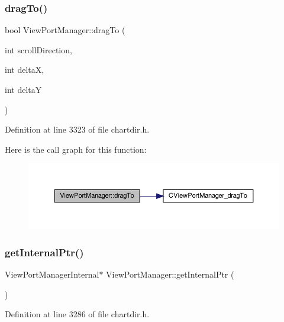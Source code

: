 \subsubsection{\texorpdfstring{drag\+To()}{dragTo()}}
{\footnotesize\ttfamily bool View\+Port\+Manager\+::drag\+To (\begin{DoxyParamCaption}\item[{int}]{scroll\+Direction,  }\item[{int}]{deltaX,  }\item[{int}]{deltaY }\end{DoxyParamCaption})\hspace{0.3cm}{\ttfamily [inline]}}



Definition at line 3323 of file chartdir.\+h.

Here is the call graph for this function\+:
\nopagebreak
\begin{figure}[H]
\begin{center}
\leavevmode
\includegraphics[width=350pt]{class_view_port_manager_aeea4d7130197f70eb7ab453316e79c77_cgraph}
\end{center}
\end{figure}
\mbox{\label{class_view_port_manager_af3aa3a669ee164439737ea284c6c9cdf}} 
\subsubsection{\texorpdfstring{get\+Internal\+Ptr()}{getInternalPtr()}}
{\footnotesize\ttfamily View\+Port\+Manager\+Internal$\ast$ View\+Port\+Manager\+::get\+Internal\+Ptr (\begin{DoxyParamCaption}{ }\end{DoxyParamCaption})\hspace{0.3cm}{\ttfamily [inline]}}



Definition at line 3286 of file chartdir.\+h.

